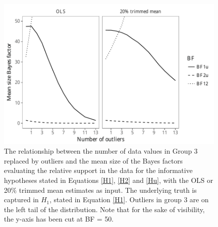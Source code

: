 \documentclass[11pt, a4paper]{article}
\begin{document}
\begin{figure}[p]
\begin{center}

	\begin{minipage}{.5\textheight}
	\includegraphics[scale=0.75]{partII_BF_pop1.pdf}
	\caption{The relationship between the number of data values in Group 3
	replaced by outliers and the mean size of the Bayes factors evaluating the 
	relative support in the data for the informative hypotheses stated in 
	Equations \ref{H1}, \ref{H2} and \ref{Hu}, with the OLS or 20\% trimmed mean 
	estimates as input. The underlying truth is captured in $H_1$, stated in 
	Equation \ref{H1}. Outliers in group 3 are on the left tail of the 
	distribution. Note that for the sake of visibility, the y-axis has been cut at 
	BF = 50.}
	\label{Fig: BFpop1}
	\end{minipage}
	
\end{center}
\end{figure}
\end{document}
